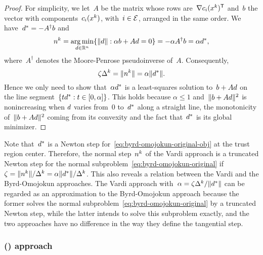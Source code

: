 \begin{proof}
    For simplicity, we let~$A$ be the matrix whose rows are~$\nabla \con{i}(\iter[k])^{\T}$ and~$b$ the vector with components~$\con{i}(\iter[k])$, with~$i \in \mathcal{E}$, arranged in the same order.
    We have~$\step[\ast] = -A^{\dagger} b$ and
    \begin{equation*}
        \nstep[k] = \argmin_{\step \in \R^n} \set{\norm{\step} : \alpha b + A \step = 0} = -\alpha A^{\dagger} b = \alpha \step[\ast],
    \end{equation*}
    where~$A^{\dagger}$ denotes the Moore-Penrose pseudoinverse of~$A$.
    Consequently,
    \begin{equation*}
        \zeta \rad[k] = \norm{\nstep[k]} = \alpha \norm{\step[\ast]}.
    \end{equation*}
    Hence we only need to show that~$\alpha \step[\ast]$ is a least-squares solution to~$b + A \step$ on the line segment~$\set{t \step[\ast] : t \in [0, \alpha]}$.
    This holds because $\alpha \le 1$ and~$\norm{b + A \step}^2$ is nonincreasing when $\step$ varies from~$0$ to~$\step[\ast]$ along a straight line, the monotonicity of~$\norm{b + A \step}^2$ coming from its convexity and the fact that~$\step[\ast]$ is its global minimizer.
\end{proof}

Note that~$\step[\ast]$ is a Newton step for~\cref{eq:byrd-omojokun-original-obj} at the trust region center.
Therefore, the normal step~$\nstep[k]$ of the Vardi approach is a truncated Newton step for the normal subproblem~\cref{eq:byrd-omojokun-original} if~$\zeta = \norm{\nstep[k]} / \rad[k]  = \alpha \norm{\step[\ast]} / \rad[k]$.
This also reveals a relation between the Vardi and the Byrd-Omojokun approaches.
The Vardi approach with~$\alpha = \zeta \rad[k] / \norm{\step[\ast]}$ can be regarded as an approximation to the Byrd-Omojokun approach because the former solves the normal subproblem~\cref{eq:byrd-omojokun-original} by a truncated Newton step, while the latter intends to solve this subproblem exactly, and the two approaches have no difference in the way they define the tangential step.

\subsubsection{ () approach}


